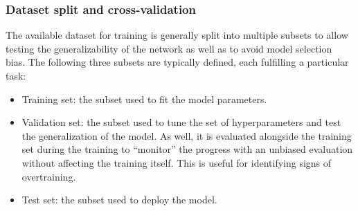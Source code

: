 \subsubsection{Dataset split and cross-validation}
\label{subsec:par:kfold-crossval}
The available dataset for training is generally split into multiple subsets to allow testing the generalizability of the network as well as to avoid model selection bias.
The following three subsets are typically defined, each fulfilling a particular task:
\begin{itemize}
    \item Training set: the subset used to fit the model parameters.
    \item Validation set: the subset used to tune the set of hyperparameters and test the generalization of the model. As well, it is evaluated alongside the training set during the training to ``monitor'' the progress with an unbiased evaluation without affecting the training itself. This is useful for identifying signs of overtraining.
    \item Test set: the subset used to deploy the model. 
\end{itemize}

